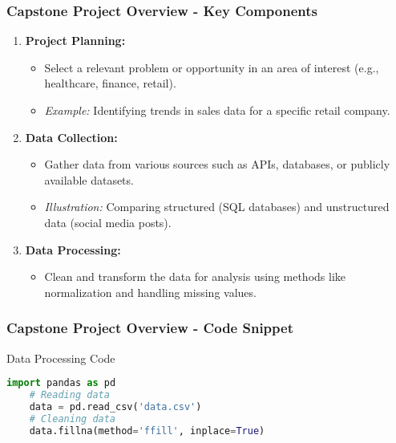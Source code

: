 \documentclass{beamer}
\begin{document}
\begin{frame}[fragile]
    \frametitle{Capstone Project Overview - Key Components}
    \begin{enumerate}
        \item \textbf{Project Planning:}
            \begin{itemize}
                \item Select a relevant problem or opportunity in an area of interest (e.g., healthcare, finance, retail).
                \item \textit{Example:} Identifying trends in sales data for a specific retail company.
            \end{itemize}

        \item \textbf{Data Collection:}
            \begin{itemize}
                \item Gather data from various sources such as APIs, databases, or publicly available datasets.
                \item \textit{Illustration:} Comparing structured (SQL databases) and unstructured data (social media posts).
            \end{itemize}

        \item \textbf{Data Processing:}
            \begin{itemize}
                \item Clean and transform the data for analysis using methods like normalization and handling missing values.
            \end{itemize}
    \end{enumerate}
\end{frame}

\begin{frame}[fragile]
    \frametitle{Capstone Project Overview - Code Snippet}
    \begin{block}{Data Processing Code}
    \begin{lstlisting}[language=Python]
    import pandas as pd
    # Reading data
    data = pd.read_csv('data.csv')
    # Cleaning data
    data.fillna(method='ffill', inplace=True)
    \end{lstlisting}
    \end{block}
\end{frame}
\end{document}
